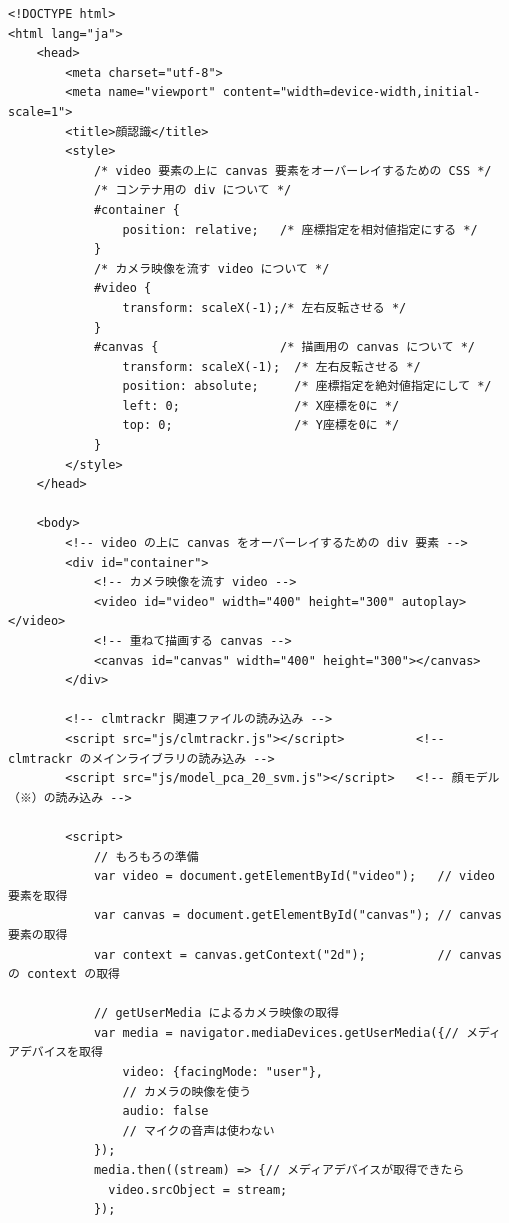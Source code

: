\documentclass[mingoth,11pt,a4j,uplatex]{jsarticle}
\begin{document}
\begin{lstlisting}[caption=07-02.html]
<!DOCTYPE html>
<html lang="ja">
    <head>
        <meta charset="utf-8">
        <meta name="viewport" content="width=device-width,initial-scale=1">
        <title>顔認識</title>
        <style>
            /* video 要素の上に canvas 要素をオーバーレイするための CSS */
            /* コンテナ用の div について */
            #container {              
                position: relative;   /* 座標指定を相対値指定にする */
            }
            /* カメラ映像を流す video について */
            #video {                  
                transform: scaleX(-1);/* 左右反転させる */
            }
            #canvas {                 /* 描画用の canvas について */
                transform: scaleX(-1);  /* 左右反転させる */
                position: absolute;     /* 座標指定を絶対値指定にして */
                left: 0;                /* X座標を0に */
                top: 0;                 /* Y座標を0に */
            }
        </style>
    </head>

    <body>
        <!-- video の上に canvas をオーバーレイするための div 要素 -->
        <div id="container">  
            <!-- カメラ映像を流す video -->
            <video id="video" width="400" height="300" autoplay></video>
            <!-- 重ねて描画する canvas -->
            <canvas id="canvas" width="400" height="300"></canvas>        
        </div>
        
        <!-- clmtrackr 関連ファイルの読み込み -->
        <script src="js/clmtrackr.js"></script>          <!-- clmtrackr のメインライブラリの読み込み -->
        <script src="js/model_pca_20_svm.js"></script>   <!-- 顔モデル（※）の読み込み -->
        
        <script>
            // もろもろの準備
            var video = document.getElementById("video");   // video 要素を取得
            var canvas = document.getElementById("canvas"); // canvas 要素の取得
            var context = canvas.getContext("2d");          // canvas の context の取得
            
            // getUserMedia によるカメラ映像の取得
            var media = navigator.mediaDevices.getUserMedia({// メディアデバイスを取得
                video: {facingMode: "user"},                          
                // カメラの映像を使う
                audio: false                                          
                // マイクの音声は使わない
            });
            media.then((stream) => {// メディアデバイスが取得できたら
              video.srcObject = stream;
            });
            

\end{lstlisting}
\end{document}
